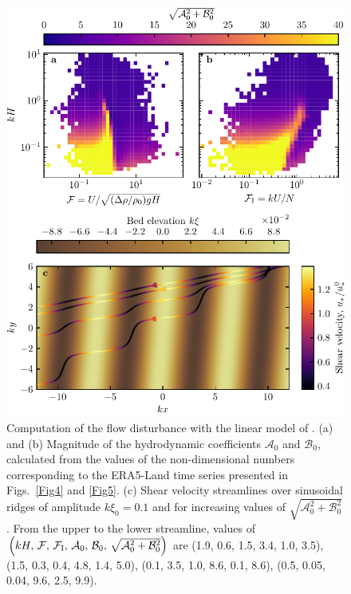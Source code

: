 \begin{figure}[p]
\centering
\includegraphics[scale=1]{Figures/Figure14_supp.pdf}
\caption{Computation of the flow disturbance with the linear model of \citet{andreotti2009}. (a) and (b) Magnitude of the hydrodynamic coefficients $\mathcal{A}_0$ and $\mathcal{B}_0$, calculated from the values of the non-dimensional numbers corresponding to the ERA5-Land time series presented in Figs.~\ref{Fig4} and \ref{Fig5}. (c) Shear velocity streamlines over sinusoidal ridges of amplitude $k\xi_0 = 0.1$ and for increasing values of $\sqrt{\mathcal{A}_{0}^{2} + \mathcal{B}_{0}^{2}}$. From the upper to the lower streamline, values of $\left(kH,\, \mathcal{F},\, \mathcal{F}_{\rm I},\, \mathcal{A}_{0},\, \mathcal{B}_{0},\, \sqrt{\mathcal{A}_{0}^{2} + \mathcal{B}_{0}^{2}}\right)$ are (1.9, 0.6, 1.5, 3.4, 1.0, 3.5), (1.5, 0.3, 0.4, 4.8, 1.4, 5.0), (0.1, 3.5, 1.0, 8.6, 0.1, 8.6), (0.5, 0.05, 0.04, 9.6, 2.5, 9.9).}
\label{Fig14_supp}
\end{figure}



